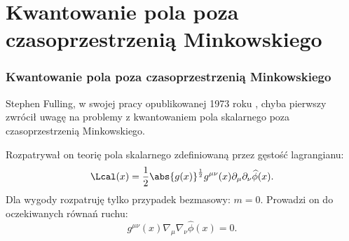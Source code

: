 \documentclass[10pt,t]{beamer}
\begin{document}
\section{Kwantowanie pola poza czasoprzestrzenią Minkowskiego}



\begin{frame}
  \frametitle{Kwantowanie pola poza czasoprzestrzenią Minkowskiego}


  Stephen Fulling, w swojej pracy opublikowanej 1973 roku
  \cite{FullingNonuniquenessOfCanocialFieldQuantizationInRiemannian1973},
  chyba pierwszy zwrócił uwagę na problemy z kwantowaniem pola
  skalarnego poza czasoprzestrzenią Minkowskiego.

  Rozpatrywał on teorię pola skalarnego zdefiniowaną przez gęstość
  lagrangianu:
  \begin{equation}
    \label{eq:Promieniowanie-Hawkinga-04}
    \Lcal( x ) =
    \frac{ 1 }{ 2 } \abs{ g( x ) }^{ \frac{ 1 }{ 2 } }
    g^{ \mu \nu }( x ) \partial_{ \mu } \partial_{ \nu } \widehat{ \phi }( x ).
  \end{equation}
  Dla wygody rozpatruję tylko przypadek bezmasowy: $m = 0$. Prowadzi
  on do oczekiwanych równań ruchu:
  \begin{equation}
    \label{eq:Promieniowanie-Hawkinga-05}
    g^{ \mu \nu }( x ) \nabla_{ \mu } \nabla_{ \nu } \widehat{ \phi }( x ) = 0.
  \end{equation}

\end{frame}
\end{document}
